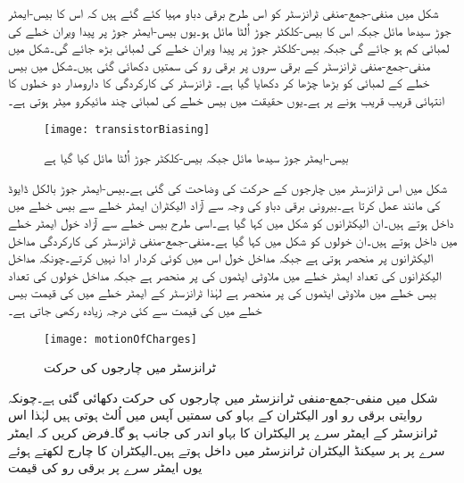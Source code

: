 	شکل   میں منفی-جمع-منفی  ٹرانزسٹر کو اس طرح برقی دباو مہیا کئے گئے ہیں کہ اس کا بیس-ایمٹر    جوڑ سیدھا مائل جبکہ اس کا بیس-کلکٹر   جوڑ اُلٹا مائل ہو۔یوں بیس-ایمٹر   جوڑ پر پیدا ویران  خطے  کی لمبائی کم ہو جائے گی جبکہ بیس-کلکٹر   جوڑ پر پیدا ویران  خطے کی لمبائی بڑھ جائے گی۔شکل میں منفی-جمع-منفی  ٹرانزسٹر کے برقی سروں پر برقی رو کی سمتیں دکھائی گئی ہیں۔شکل میں بیس خطے کے لمبائی کو بڑھا چڑھا کر دکھایا گیا ہے۔ ٹرانزسٹر کی کارکردگی کا دارومدار دو  خطوں کا انتہائی قریب قریب ہونے پر ہے۔یوں حقیقت میں بیس خطے کی لمبائی چند مائیکرو میٹر  ہوتی ہے۔
\begin{figure}
\centering
\texttt{[image: transistorBiasing]}
\caption{ بیس-ایمٹر  جوڑ  سیدھا مائل جبکہ بیس-کلکٹر جوڑ اُلٹا مائل کیا گیا ہے}
\label{شکل_ٹرانزسٹر_مائل_کرنا}
\end{figure}
	شکل   میں اس ٹرانزسٹر میں چارجوں کے حرکت کی وضاحت کی گئی ہے۔بیس-ایمٹر  جوڑ بالکل ڈایوڈ کی مانند عمل کرتا ہے۔بیرونی برقی دباو کی وجہ سے آزاد الیکٹران ایمٹر خطے سے بیس خطے میں داخل ہوتے ہیں۔ان الیکٹرانوں کو شکل میں  کہا گیا ہے۔اسی طرح بیس خطے سے آزاد خول ایمٹر خطے میں داخل ہوتے ہیں۔ان خولوں کو شکل میں  کہا گیا ہے۔منفی-جمع-منفی ٹرانزسٹر کی کارکردگی مداخل الیکٹرانوں پر منحصر ہوتی ہے جبکہ مداخل خول اس میں کوئی کردار ادا نہیں کرتے۔چونکہ مداخل الیکٹرانوں کی تعداد ایمٹر خطے میں ملاوٹی ایٹموں کی    پر منحصر ہے جبکہ مداخل خولوں کی تعداد بیس خطے میں ملاوٹی ایٹموں کی   پر منحصر ہے لہٰذا ٹرانزسٹر کے ایمٹر خطے میں   کی قیمت  بیس خطے میں  کی قیمت سے کئی درجہ زیادہ رکھی جاتی ہے۔
\begin{figure}
\centering
\texttt{[image: motionOfCharges]}
\caption{ ٹرانزسٹر میں چارجوں کی حرکت}
\label{شکل_ٹرانزسٹر_میں_چارجوں_کی_حرکت}
\end{figure}
	شکل  میں منفی-جمع-منفی  ٹرانزسٹر میں چارجوں کی حرکت دکھائی گئی ہے۔چونکہ روایتی برقی رو اور الیکٹران کے بہاو کی سمتیں آپس میں اُلٹ ہوتی ہیں لہٰذا اس ٹرانزسٹر کے ایمٹر سرے پر الیکٹران کا بہاو اندر کی جانب ہو گا۔فرض کریں کہ ایمٹر سرے پر ہر سیکنڈ  الیکٹران ٹرانزسٹر میں داخل ہوتے ہیں۔الیکٹران کا چارج  لکھتے ہوئے یوں ایمٹر سرے پر برقی رو  کی قیمت
